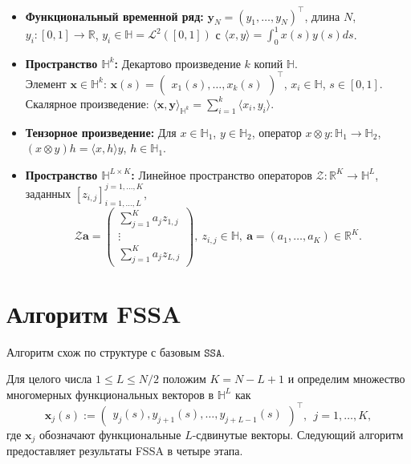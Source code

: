 \documentclass[12pt, specialist, subf
]{disser}
\theoremstyle{definition}
\newcommand{\SSA}{\texttt{SSA}}
\begin{document}
\begin{itemize}
	\item \textbf{Функциональный временной ряд:} $\textbf{y}_N=(y_1,\ldots,y_N)^\top$, длина $N$, $y_i:[0,1]\to\mathbb{R}$, $y_i\in\mathbb{H}=\mathcal{L}^2([0,1])$ с $\langle x,y\rangle=\int_0^1 x(s)y(s)ds$.

	\item \textbf{Пространство $\mathbb{H}^k$:} Декартово произведение $k$ копий $\mathbb{H}$. \\ Элемент ${\pmb x}\in\mathbb{H}^k$: ${\pmb x}(s)=\begin{pmatrix} x_1(s),\ldots,x_k(s)\end{pmatrix}^\top$, $x_i\in\mathbb{H}$, $s\in[0,1]$. Скалярное произведение: $\langle\pmb x,\pmb y\rangle_{\mathbb{H}^k}=\sum_{i=1}^k\langle x_i,y_i\rangle$.

	\item \textbf{Тензорное произведение:} Для $x\in\mathbb{H}_1$, $y\in\mathbb{H}_2$, оператор $x\otimes y:\mathbb{H}_1\to\mathbb{H}_2$, $(x\otimes y)h=\langle x,h\rangle y$, $h\in\mathbb{H}_1$.

	\item \textbf{Пространство $\mathbb{H}^{L\times K}$:} Линейное пространство операторов $\mathcal{Z}:\mathbb{R}^K\to\mathbb{H}^L$, заданных $[z_{i,j}]_{i=1,\ldots,L}^{j=1,\ldots,K}$,
	      \begin{equation}\label{eq: z operator}
		      \mathcal{Z}\pmb{a}=\begin{pmatrix} \sum_{j=1}^K a_j z_{1,j} \\ \vdots \\ \sum_{j=1}^K a_j z_{L,j} \end{pmatrix}, \ z_{i,j}\in\mathbb{H}, \ \pmb{a}=(a_1,\ldots,a_K)\in\mathbb{R}^K.
	      \end{equation}

\end{itemize}






\section{Алгоритм FSSA}
Алгоритм схож по структуре с базовым $\SSA$.

Для целого числа $1\leq L\leq{N}/{2}$ положим $K=N-L+1$ и определим множество многомерных функциональных векторов в $\mathbb{H}^L$ как
\begin{equation}\label{flvec}
	{\pmb x}_j(s):= \begin{pmatrix} y_j(s), y_{j+1}(s), \ldots, y_{j+L-1}(s)\end{pmatrix}^\top,\ \ j=1,\ldots, K,
\end{equation}
где ${\pmb x}_j$ обозначают функциональные $L$-сдвинутые векторы. Следующий алгоритм предоставляет результаты FSSA в четыре этапа.
\end{document}
